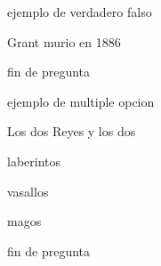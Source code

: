 \documentclass{gift}
\begin{document}
\begin{giftComentario}
 ejemplo de verdadero falso

\end  {giftComentario}
\begin{giftFragmento}
Grant murio en 1886\end  {giftFragmento}



\begin{giftFragmento}
\end  {giftFragmento}


\begin{giftComentario}
 fin de pregunta
\end  {giftComentario}

\begin{giftComentario}
 ejemplo de multiple opcion
\end  {giftComentario}
\begin{giftFragmento}
Los dos Reyes y los dos\end  {giftFragmento}


\begin{giftMO}
\item \begin{giftFragmento}
laberintos\end  {giftFragmento}


\item \begin{giftFragmento}
vasallos\end  {giftFragmento}


\item \begin{giftFragmento}
magos\end  {giftFragmento}


\end  {giftMO}

\begin{giftFragmento}
\end  {giftFragmento}


\begin{giftComentario}
 fin de pregunta
\end  {giftComentario}
\end{document}
